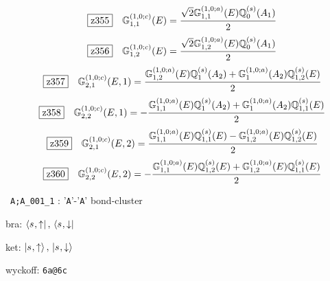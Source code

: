 \documentclass[fleqn,10pt,landscape]{jsarticle}
\begin{document}
\begin{dmath*}
\hspace*{3mm}\fbox{z355}\quad \mathbb{G}_{1,1}^{(1,0;c)}(E)=\frac{\sqrt{2} \mathbb{G}_{1,1}^{(1,0;a)}(E) \mathbb{Q}_{0}^{(s)}(A_{1})}{2}
\end{dmath*}
\begin{dmath*}
\hspace*{3mm}\fbox{z356}\quad \mathbb{G}_{1,2}^{(1,0;c)}(E)=\frac{\sqrt{2} \mathbb{G}_{1,2}^{(1,0;a)}(E) \mathbb{Q}_{0}^{(s)}(A_{1})}{2}
\end{dmath*}
\begin{dmath*}
\hspace*{3mm}\fbox{z357}\quad \mathbb{G}_{2,1}^{(1,0;c)}(E,1)=\frac{\mathbb{G}_{1,2}^{(1,0;a)}(E) \mathbb{Q}_{1}^{(s)}(A_{2}) + \mathbb{G}_{1}^{(1,0;a)}(A_{2}) \mathbb{Q}_{1,2}^{(s)}(E)}{2}
\end{dmath*}
\begin{dmath*}
\hspace*{3mm}\fbox{z358}\quad \mathbb{G}_{2,2}^{(1,0;c)}(E,1)=- \frac{\mathbb{G}_{1,1}^{(1,0;a)}(E) \mathbb{Q}_{1}^{(s)}(A_{2}) + \mathbb{G}_{1}^{(1,0;a)}(A_{2}) \mathbb{Q}_{1,1}^{(s)}(E)}{2}
\end{dmath*}
\begin{dmath*}
\hspace*{3mm}\fbox{z359}\quad \mathbb{G}_{2,1}^{(1,0;c)}(E,2)=\frac{\mathbb{G}_{1,1}^{(1,0;a)}(E) \mathbb{Q}_{1,1}^{(s)}(E) - \mathbb{G}_{1,2}^{(1,0;a)}(E) \mathbb{Q}_{1,2}^{(s)}(E)}{2}
\end{dmath*}
\begin{dmath*}
\hspace*{3mm}\fbox{z360}\quad \mathbb{G}_{2,2}^{(1,0;c)}(E,2)=- \frac{\mathbb{G}_{1,1}^{(1,0;a)}(E) \mathbb{Q}_{1,2}^{(s)}(E) + \mathbb{G}_{1,2}^{(1,0;a)}(E) \mathbb{Q}_{1,1}^{(s)}(E)}{2}
\end{dmath*}
\vspace{5mm}

\noindent\textbullet\, \texttt{A;A_001_1} : '\texttt{A}'-'\texttt{A}' bond-cluster

\noindent\quad * bra: $\bra{s_{},\uparrow},\, \bra{s_{},\downarrow}$

\noindent\quad * ket: $\ket{s_{},\uparrow},\, \ket{s_{},\downarrow}$

\noindent\quad * wyckoff: \texttt{6a@6c}
\end{document}
